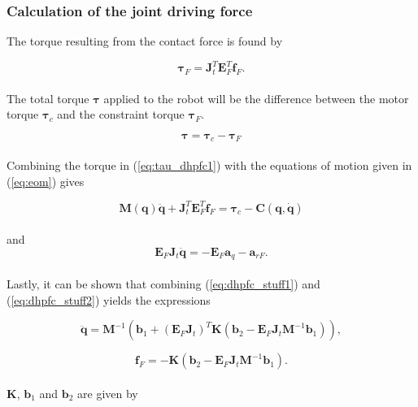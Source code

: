 \subsubsection{Calculation of the joint driving force}

The torque resulting from the contact force is found by

\begin{equation}
    \boldsymbol{\tau}_F = \mathbf{J}_t^T \mathbf{E}_F^T \mathbf{f}_F.
\end{equation}
\\
The total torque $\boldsymbol{\tau}$ applied to the robot will be the difference between the motor torque $\boldsymbol{\tau}_c$ and the constraint torque $\boldsymbol{\tau}_F$.

\begin{equation}\label{eq:tau_dhpfc1}
    \boldsymbol{\tau} = \boldsymbol{\tau}_c - \boldsymbol{\tau}_F
\end{equation}
\\

Combining the torque in (\ref{eq:tau_dhpfc1}) with the equations of motion given in (\ref{eq:eom}) gives

\begin{equation}\label{eq:dhpfc_stuff1}
    \mathbf{M(q) \ddot{q}} + \mathbf{J}_t^T \mathbf{E}^T_F \mathbf{f}_F = \boldsymbol{\tau}_c - \mathbf{C(q, \dot{q})}
\end{equation}
\\
and
\begin{equation}\label{eq:dhpfc_stuff2}
    \mathbf{E}_F \mathbf{J}_t\mathbf{\ddot{q}} = - \mathbf{E}_F \mathbf{a}_q - \mathbf{a}_{rF}.
\end{equation}
\\
Lastly, it can be shown that combining (\ref{eq:dhpfc_stuff1}) and (\ref{eq:dhpfc_stuff2}) yields the expressions

\begin{equation}
    \mathbf{\ddot{q}} = \mathbf{M}^{-1}(\mathbf{b}_1 + (\mathbf{E}_F \mathbf{J}_t)^T \mathbf{K} (\mathbf{b}_2 - \mathbf{E}_F \mathbf{J}_t \mathbf{M}^{-1} \mathbf{b}_1)),
\end{equation}

\begin{equation}
    \mathbf{f}_F = -\mathbf{K} (\mathbf{b}_2 - \mathbf{E}_F \mathbf{J}_t \mathbf{M}^{-1} \mathbf{b}_1).
\end{equation}
\\
$\mathbf{K}$, $\mathbf{b}_1$ and $\mathbf{b}_2$ are given by

